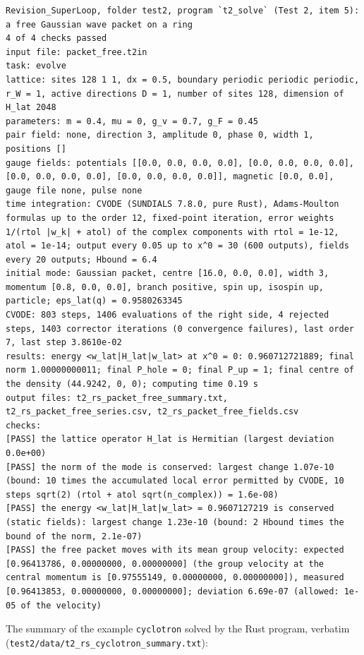 \documentclass[
  10pt,
]{article}
\begin{document}
\begin{verbatim}
Revision_SuperLoop, folder test2, program `t2_solve` (Test 2, item 5): a free Gaussian wave packet on a ring
4 of 4 checks passed
input file: packet_free.t2in
task: evolve
lattice: sites 128 1 1, dx = 0.5, boundary periodic periodic periodic, r_W = 1, active directions D = 1, number of sites 128, dimension of H_lat 2048
parameters: m = 0.4, mu = 0, g_v = 0.7, g_F = 0.45
pair field: none, direction 3, amplitude 0, phase 0, width 1, positions []
gauge fields: potentials [[0.0, 0.0, 0.0, 0.0], [0.0, 0.0, 0.0, 0.0], [0.0, 0.0, 0.0, 0.0], [0.0, 0.0, 0.0, 0.0]], magnetic [0.0, 0.0], gauge file none, pulse none
time integration: CVODE (SUNDIALS 7.8.0, pure Rust), Adams-Moulton formulas up to the order 12, fixed-point iteration, error weights 1/(rtol |w_k| + atol) of the complex components with rtol = 1e-12, atol = 1e-14; output every 0.05 up to x^0 = 30 (600 outputs), fields every 20 outputs; Hbound = 6.4
initial mode: Gaussian packet, centre [16.0, 0.0, 0.0], width 3, momentum [0.8, 0.0, 0.0], branch positive, spin up, isospin up, particle; eps_lat(q) = 0.9580263345
CVODE: 803 steps, 1406 evaluations of the right side, 4 rejected steps, 1403 corrector iterations (0 convergence failures), last order 7, last step 3.8610e-02
results: energy <w_lat|H_lat|w_lat> at x^0 = 0: 0.960712721889; final norm 1.00000000011; final P_hole = 0; final P_up = 1; final centre of the density (44.9242, 0, 0); computing time 0.19 s
output files: t2_rs_packet_free_summary.txt, t2_rs_packet_free_series.csv, t2_rs_packet_free_fields.csv
checks:
[PASS] the lattice operator H_lat is Hermitian (largest deviation 0.0e+00)
[PASS] the norm of the mode is conserved: largest change 1.07e-10 (bound: 10 times the accumulated local error permitted by CVODE, 10 steps sqrt(2) (rtol + atol sqrt(n_complex)) = 1.6e-08)
[PASS] the energy <w_lat|H_lat|w_lat> = 0.9607127219 is conserved (static fields): largest change 1.23e-10 (bound: 2 Hbound times the bound of the norm, 2.1e-07)
[PASS] the free packet moves with its mean group velocity: expected [0.96413786, 0.00000000, 0.00000000] (the group velocity at the central momentum is [0.97555149, 0.00000000, 0.00000000]), measured [0.96413853, 0.00000000, 0.00000000]; deviation 6.69e-07 (allowed: 1e-05 of the velocity)
\end{verbatim}

The summary of the example \texttt{cyclotron} solved by the Rust
program, verbatim (\texttt{test2/data/t2\_rs\_cyclotron\_summary.txt}):
\end{document}
